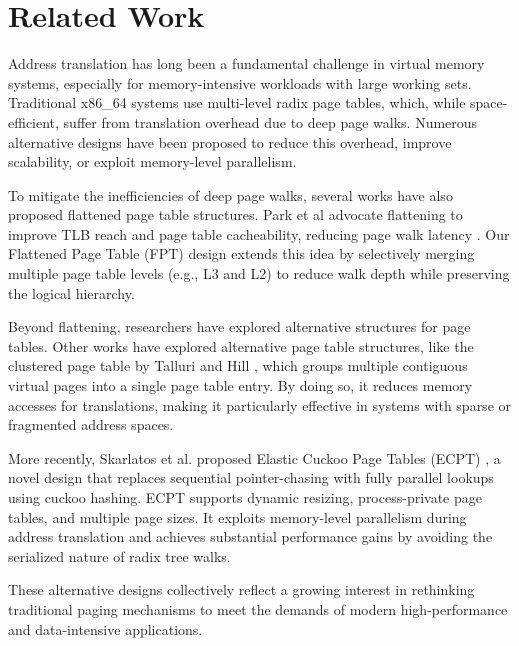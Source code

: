 \section{Related Work}

Address translation has long been a fundamental challenge in virtual memory systems, especially for memory-intensive workloads with large working sets. Traditional x86\_64 systems use multi-level radix page tables, which, while space-efficient, suffer from translation overhead due to deep page walks. Numerous alternative designs have been proposed to reduce this overhead, improve scalability, or exploit memory-level parallelism.

To mitigate the inefficiencies of deep page walks, several works have also proposed flattened page table structures. Park et al advocate flattening to improve TLB reach and page table cacheability, reducing page walk latency \cite{every_walks_a_hit}. Our Flattened Page Table (FPT) design extends this idea by selectively merging multiple page table levels (e.g., L3 and L2) to reduce walk depth while preserving the logical hierarchy.

Beyond flattening, researchers have explored alternative structures for page tables. Other works have explored alternative page table structures, like the clustered page table by Talluri and Hill \cite{clustered}, which groups multiple contiguous virtual pages into a single page table entry. By doing so, it reduces memory accesses for translations, making it particularly effective in systems with sparse or fragmented address spaces.

More recently, Skarlatos et al. proposed Elastic Cuckoo Page Tables (ECPT) \cite{ecpt}, a novel design that replaces sequential pointer-chasing with fully parallel lookups using cuckoo hashing. ECPT supports dynamic resizing, process-private page tables, and multiple page sizes. It exploits memory-level parallelism during address translation and achieves substantial performance gains by avoiding the serialized nature of radix tree walks.

These alternative designs collectively reflect a growing interest in rethinking traditional paging mechanisms to meet the demands of modern high-performance and data-intensive applications.
